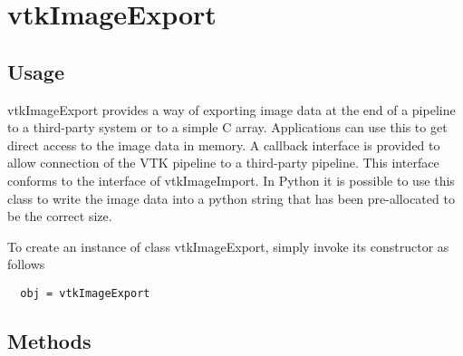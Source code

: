 \section{vtkImageExport}

\subsection{Usage}

 vtkImageExport provides a way of exporting image data at the end
 of a pipeline to a third-party system or to a simple C array.
 Applications can use this to get direct access to the image data
 in memory.  A callback interface is provided to allow connection
 of the VTK pipeline to a third-party pipeline.  This interface
 conforms to the interface of vtkImageImport.
 In Python it is possible to use this class to write the image data
 into a python string that has been pre-allocated to be the correct
 size.

To create an instance of class vtkImageExport, simply
invoke its constructor as follows
\begin{verbatim}
  obj = vtkImageExport
\end{verbatim}
\subsection{Methods}

